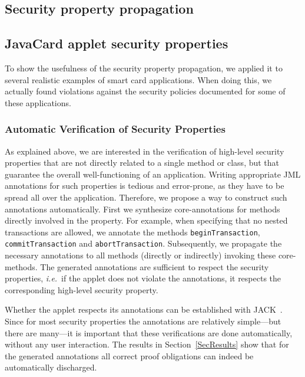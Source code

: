 \subsection{Security property propagation}\label{sec:highlevel}



\subsection{JavaCard applet security properties}
To show the usefulness of the security property propagation, we applied it to
several realistic examples of smart card applications. When doing
this, we actually found violations against the security policies
documented for some of these applications.



\subsubsection{Automatic Verification of Security Properties}\label{SecVerif}
As explained above, we are interested in the verification of
high-level security properties that are not directly related to a
single method or class, but that guarantee the overall
well-functioning of an application. Writing appropriate JML
annotations for such properties is tedious and error-prone, as they
have to be spread all over the application. Therefore, we propose a
way to construct such annotations automatically. First we synthesize
core-annotations for methods directly involved in the property.  For
example, when specifying that no nested transactions are allowed, we
annotate the methods \texttt{beginTransaction},
\texttt{commitTransaction} and
\texttt{abortTransaction}. Subsequently, we propagate the necessary 
annotations to all methods (directly or indirectly) invoking these
core-methods.  The generated annotations are sufficient to respect the
security properties, \emph{i.e.}~if the applet does not violate the
annotations, it respects the corresponding high-level security
property.

Whether the applet respects its annotations can be established with
JACK~\cite{BRL-JACK}. Since for most security properties the
annotations are relatively simple---but there are many---it is
important that these verifications are done automatically, without any
user interaction. The results in Section~\ref{SecResults} show that
for the generated annotations all correct proof obligations can indeed
be automatically discharged.


%

